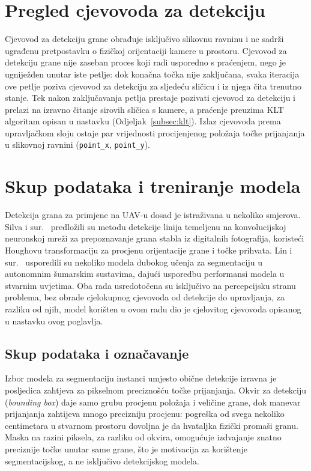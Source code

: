 \section{Pregled cjevovoda za detekciju}
\label{sec:pregled-cjevovoda}

Cjevovod za detekciju grane obrađuje isključivo slikovnu ravninu i ne sadrži ugrađenu pretpostavku o fizičkoj orijentaciji kamere u prostoru. Cjevovod za detekciju grane nije zaseban proces koji radi usporedno s praćenjem, nego je ugniježđen unutar iste petlje: dok konačna točka nije zaključana, svaka iteracija ove petlje poziva cjevovod za detekciju za sljedeću sličicu i iz njega čita trenutno stanje. Tek nakon zaključavanja petlja prestaje pozivati cjevovod za detekciju i prelazi na izravno čitanje sirovih sličica s kamere, a praćenje preuzima KLT algoritam opisan u nastavku (Odjeljak~\ref{subsec:klt}). Izlaz cjevovoda prema upravljačkom sloju ostaje par vrijednosti procijenjenog položaja točke prijanjanja u slikovnoj ravnini (\texttt{point\_x}, \texttt{point\_y}).

\section{Skup podataka i treniranje modela}
\label{sec:treniranje-modela}

Detekcija grana za primjene na UAV-u dosad je istraživana u nekoliko smjerova. Silva i sur.~\cite{SILVA2022102759} predložili su metodu detekcije linija temeljenu na konvolucijskoj neuronskoj mreži za prepoznavanje grana stabla iz digitalnih fotografija, koristeći Houghovu transformaciju za procjenu orijentacije grane i točke prihvata. Lin i sur.~\cite{lin2025performanceevaluationdeeplearning} usporedili su nekoliko modela dubokog učenja za segmentaciju u autonomnim šumarskim sustavima, dajući usporedbu performansi modela u stvarnim uvjetima. Oba rada usredotočena su isključivo na percepcijsku stranu problema, bez obrade cjelokupnog cjevovoda od detekcije do upravljanja, za razliku od njih, model korišten u ovom radu dio je cjelovitog cjevovoda opisanog u nastavku ovog poglavlja.

\subsection{Skup podataka i označavanje}
Izbor modela za segmentaciju instanci umjesto obične detekcije izravna je posljedica zahtjeva za pikselnom preciznošću točke prijanjanja. Okvir za detekciju (\emph{bounding box}) daje samo grubu procjenu položaja i veličine grane, dok manevar prijanjanja zahtijeva mnogo precizniju procjenu: pogreška od svega nekoliko centimetara u stvarnom prostoru dovoljna je da hvataljka fizički promaši granu. Maska na razini piksela, za razliku od okvira, omogućuje izdvajanje znatno preciznije točke unutar same grane, što je motivacija za korištenje segmentacijskog, a ne isključivo detekcijskog modela.

